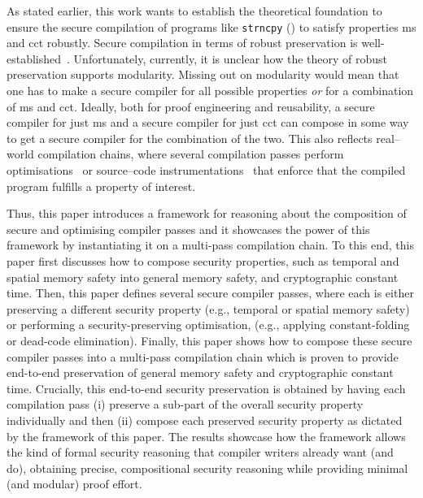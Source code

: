\documentclass[utf8,acmsmall,review,screen,dvipsnames]{acmart}
\begin{document}
As stated earlier, this work wants to establish the theoretical foundation to ensure the secure compilation of programs like \texttt{strncpy} () to satisfy properties \gls{ms} and \gls{cct} robustly.
Secure compilation in terms of robust preservation is well-established~\cite{abate2019jour,abate2021extacc,patrignani2021rsc}.
Unfortunately, currently, it is unclear how the theory of robust preservation supports modularity.
Missing out on modularity would mean that one has to make a secure compiler for all possible properties {\em or} for a combination of \gls{ms} and \gls{cct}.
Ideally, both for proof engineering and reusability, a secure compiler for just \gls{ms} and a secure compiler for just \gls{cct} can compose in some way to get a secure compiler for the combination of the two.
This also reflects real--world compilation chains, where several compilation passes perform optimisations~\cite{lattner2004llvm,googlev8,androidstudio,kuepper2023cryptopt,manjikian1997fusion,wegman1991ccp} or source--code instrumentations~\cite{nagarakatte2009soft,nagarakatte2010cets,akritidis2009baggy,dhumbumroong2020boundwarden,jung2021pico,nam2019framer,shankaranarayana2023tailcheck,younan2010paricheck,zhou2023fatptrs,bond2017vale,almeida2017jasmin,kuepper2023cryptopt,cauligi2019fact} that enforce that the compiled program fulfills a property of interest.

Thus, this paper introduces a framework for reasoning about the composition of secure and optimising compiler passes and it showcases the power of this framework by instantiating it on a multi-pass compilation chain.
To this end, this paper first discusses how to compose security properties, such as temporal and spatial memory safety into general memory safety, and cryptographic constant time.
Then, this paper defines several secure compiler passes, where each is either preserving a different security property (e.g., temporal or spatial memory safety) or performing a security-preserving optimisation, (e.g., applying constant-folding or dead-code elimination).
Finally, this paper shows how to compose these secure compiler passes into a multi-pass compilation chain which is proven to provide end-to-end preservation of general memory safety and cryptographic constant time.
Crucially, this end-to-end security preservation is obtained by having each compilation pass (i) preserve a sub-part of the overall security property individually and then (ii) compose each preserved security property as dictated by the framework of this paper.
The results showcase how the framework allows the kind of formal security reasoning that compiler writers already want (and do), obtaining precise, compositional security reasoning while providing minimal (and modular) proof effort.
\end{document}
